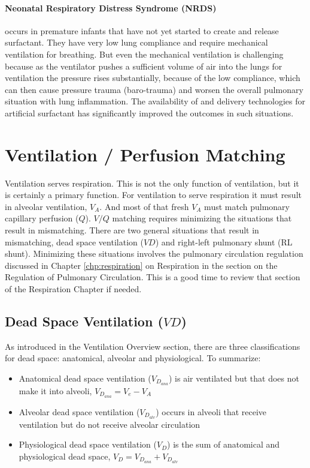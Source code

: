 \paragraph{Neonatal Respiratory Distress Syndrome (NRDS)} occurs in premature infants that have not yet started to create and release surfactant. They have very low lung compliance and require mechanical ventilation for breathing. But even the mechanical ventilation is challenging because as the ventilator pushes a sufficient volume of air into the lungs for ventilation the pressure rises substantially, because of the low compliance, which can then cause pressure trauma (baro-trauma) and worsen the overall pulmonary situation with lung inflammation. The availability of and delivery technologies for artificial surfactant has significantly improved the outcomes in such situations.

\section{Ventilation / Perfusion Matching}

Ventilation serves respiration. This is not the only function of ventilation, but it is certainly a primary function. For ventilation to serve respiration it must result in alveolar ventilation, $V_A$. And most of that fresh $V_A$ must match pulmonary capillary perfusion ($Q$). $V/Q$ matching requires minimizing the situations that result in mismatching. There are two general situations that result in mismatching, dead space ventilation ($VD$) and right-left pulmonary shunt (RL shunt). Minimizing these situations involves the pulmonary circulation regulation discussed in Chapter \ref{chp:respiration} on Respiration in the section on the Regulation of Pulmonary Circulation. This is a good time to review that section of the Respiration Chapter if needed.

\subsection{Dead Space Ventilation ($VD$)}

As introduced in the Ventilation Overview section, there are three classifications for dead space: anatomical, alveolar and physiological.  
\vspace{3mm}
To summarize:
\begin{itemize}
       \item Anatomical dead space ventilation ($V_D_{ana}$) is air ventilated but that does not make it into alveoli, $V_D_{ana} = V_e - V_A$
    \item Alveolar dead space ventilation ($V_D_{alv}$) occurs in alveoli that receive ventilation but do not receive alveolar circulation
    \item Physiological dead space ventilation ($V_D$) is the sum of anatomical and physiological dead space, $V_D = V_D_{ana} + V_D_{alv}$
\end{itemize}

